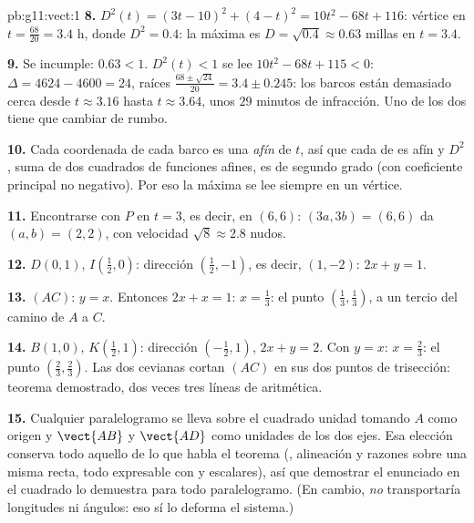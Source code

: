 \begin{solution}{pb:g11:vect:1}
\textbf{8.} $D^2(t) = (3t - 10)^2 + (4 - t)^2 = 10t^2 - 68t + 116$:
vértice en $t = \frac{68}{20} = 3.4$ h, donde $D^2 = 0.4$: la máxima
 es $D = \sqrt{0.4} \approx 0.63$ millas en $t = 3.4$.

\textbf{9.} Se incumple: $0.63 < 1$. $D^2(t) < 1$ se lee
$10t^2 - 68t + 115 < 0$: $\Delta = 4624 - 4600 = 24$, raíces
$\frac{68 \pm \sqrt{24}}{20} = 3.4 \pm 0.245$: los barcos están demasiado
cerca desde $t \approx 3.16$ hasta $t \approx 3.64$, unos $29$ minutos de
infracción. Uno de los dos tiene que cambiar de rumbo.

\textbf{10.} Cada coordenada de cada barco es una  \emph{afín} de
$t$, así que cada  de  es afín y $D^2$, suma de dos
cuadrados de funciones afines, es de segundo grado (con coeficiente
principal no negativo). Por eso la máxima  se lee siempre en
un vértice.

\textbf{11.} Encontrarse con $P$ en $t = 3$, es decir, en $(6, 6)$:
$(3a, 3b) = (6, 6)$ da $(a, b) = (2, 2)$, con velocidad
$\sqrt{8} \approx 2.8$ nudos.

\textbf{12.} $D(0, 1)$, $I\left(\frac12, 0\right)$: dirección
$\left(\frac12, -1\right)$, es decir, $(1, -2)$:  $2x + y = 1$.

\textbf{13.} $(AC)$: $y = x$. Entonces $2x + x = 1$: $x = \frac13$: el
punto $\left(\frac13, \frac13\right)$, a un tercio del camino de $A$ a
$C$.

\textbf{14.} $B(1, 0)$, $K\left(\frac12, 1\right)$: dirección
$\left(-\frac12, 1\right)$,  $2x + y = 2$. Con $y = x$:
$x = \frac23$: el punto $\left(\frac23, \frac23\right)$. Las dos cevianas
cortan $(AC)$ en sus dos puntos de trisección: teorema demostrado, dos
veces tres líneas de aritmética.

\textbf{15.} Cualquier paralelogramo se lleva sobre el cuadrado unidad
tomando $A$ como origen y $\vect{AB}$ y $\vect{AD}$ como unidades de los
dos ejes. Esa elección conserva todo aquello de lo que habla el teorema
(, alineación y razones sobre una misma recta, todo
expresable con  y escalares), así que demostrar el enunciado en el
cuadrado lo demuestra para todo paralelogramo. (En cambio, \emph{no}
transportaría longitudes ni ángulos: eso sí lo deforma el sistema.)


\end{solution}

